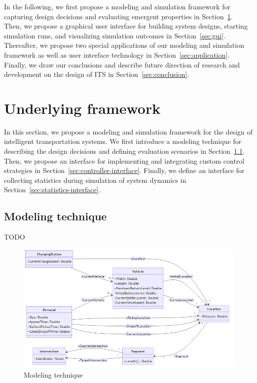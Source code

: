 \documentclass[10pt,twocolumn]{article}
\begin{document}
In the following, we first propose a modeling and simulation framework for capturing design decisions and evaluating emergent properties in Section~\ref{sec:framework}.
Then, we propose a graphical user interface for building system designs, starting simulation runs, and visualizing simulation outcomes in Section~\ref{sec:gui}.
Thereafter, we propose two special applications of our modeling and simulation framework as well as user interface technology in Section~\ref{sec:application}.
Finally, we draw our conclusions and describe future direction of research and development on the design of ITS in Section~\ref{sec:conclusion}. 

\section{Underlying framework}
\label{sec:framework}

In this section, we propose a modeling and simulation framework for the design of intelligent transportation systems.
We first introduce a modeling technique for describing the design decisions and defining evaluation scenarios in Section~\ref{sec:modeling-technique}.
Then, we propose an interface for implementing and integrating custom control strategies in Section~\ref{sec:controller-interface}.
Finally, we define an interface for collecting statistics during simulation of system dynamics in Section~\ref{sec:statistics-interface}.

\subsection{Modeling technique}
\label{sec:modeling-technique}

TODO

\begin{figure}[tbp]
    \includegraphics[width=\textwidth]{../../diagrams/model/classes-v0.1.png}
    \caption{Modeling technique}
    \label{fig:modeling-technique}
\end{figure}
\end{document}
